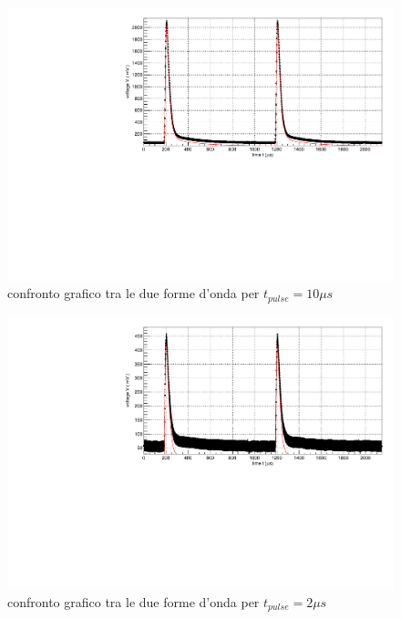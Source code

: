 \documentclass{article}
\begin{document}
\begin{center}
\begin{figure}[H]
\centering
\includegraphics[scale=0.4, angle=0]{arduino10.pdf}
\caption{confronto grafico tra le due forme d'onda per $t_{pulse}=10 \mu s$}
\label{fig:arduino10}
\end{figure}
\end{center}

\begin{center}
\begin{figure}[H]
\centering
\includegraphics[scale=0.4, angle=0]{arduino2.pdf}
\caption{confronto grafico tra le due forme d'onda per $t_{pulse}=2 \mu s$}
\label{fig:arduino2}
\end{figure}
\end{center}
\end{document}
